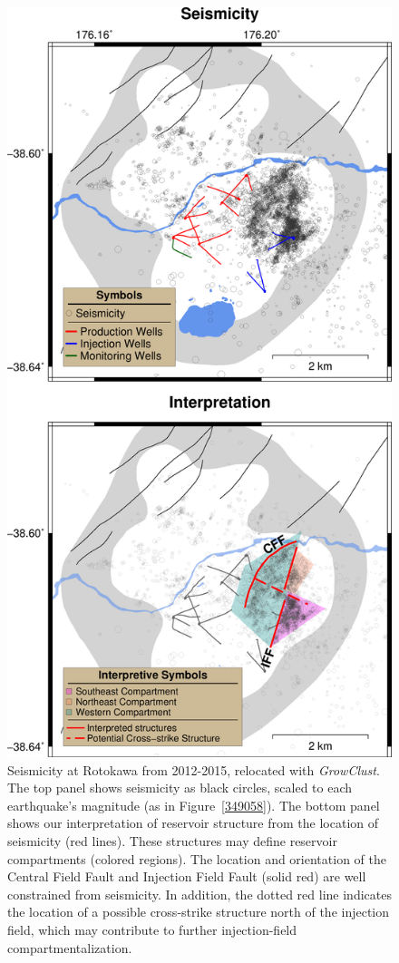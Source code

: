 \begin{figure}[p]
\begin{center}
\includegraphics[width=0.66\columnwidth]{Chapter_4_Rot/figures/merc_Rot_dets_GC_boundaries/merc_Rot_dets_GC_boundaries_labs}
\caption[Reservoir compartments inferred from seismicity]{{
Seismicity at Rotokawa from 2012-2015, relocated with \textit{GrowClust}. The top
panel shows seismicity as black circles, scaled to each earthquake's
magnitude (as in Figure~{\ref{349058}}). The bottom
panel shows our interpretation of reservoir structure from the location
of seismicity (red lines). These structures may define reservoir
compartments (colored regions). The location and orientation of the
Central Field Fault and Injection Field Fault (solid red) are well
constrained from seismicity. In addition, the dotted red line indicates
the location of a possible cross-strike structure north of the injection
field, which may contribute to further injection-field
compartmentalization.
{\label{935417}}%
}}
\end{center}
\end{figure}

